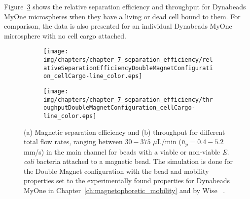 Figure~\ref{fig:relativeSeparationEfficiencyAndParticleThroughputDoubleMagnetConfigurationCellCargo} shows the relative separation efficiency and throughput for Dynabeads MyOne microspheres when they have a living or dead cell bound to them. For comparison, the data is also presented for an individual Dynabeads MyOne microsphere with no cell cargo attached.

\begin{figure}[htb]
        \centering
        \begin{subfigure}[b]{0.48\textwidth}
                \texttt{[image: img/chapters/chapter\_7\_separation\_efficiency/relativeSeparationEfficiencyDoubleMagnetConfiguration\_cellCargo-line\_color.eps]}
                \caption{}  
                \label{fig:relativeSeparationEfficiencyDoubleMagnetConfigurationCellCargo}
        \end{subfigure}
        \hfill
        \begin{subfigure}[b]{0.48\textwidth}
                \texttt{[image: img/chapters/chapter\_7\_separation\_efficiency/throughputDoubleMagnetConfiguration\_cellCargo-line\_color.eps]}
                \caption{}       
                \label{fig:particleThroughputDoubleMagnetConfigurationCellCargo}         
        \end{subfigure}
        \caption[Relative magnetic separation efficiency and throughput when a viable or non-viable cell cargo is attached to a magnetic bead for different flow rates using the Double Magnet configuration]{(a) Magnetic separation efficiency and (b) throughput for different total flow rates, ranging between $30-375$ $\mu$L/min ($\bar{u}_{p}=0.4-5.2$ mm/s) in the main channel for beads with a viable or non-viable \textit{E. coli} bacteria attached to a magnetic bead. The simulation is done for the Double Magnet configuration with the bead and mobility properties set to the experimentally found properties for Dynabeads MyOne in Chapter~\ref{ch:magnetophoretic_mobility} and by Wise \etal{}~\cite{WisePhD2015}.}
        \label{fig:relativeSeparationEfficiencyAndParticleThroughputDoubleMagnetConfigurationCellCargo}
\end{figure}

